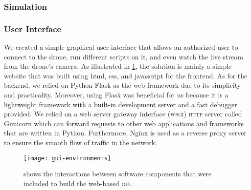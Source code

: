 \documentclass[../main.tex]{subfiles}
\begin{document}
\subsubsection{Simulation}

\lipsum[5]

\subsubsection{User Interface}

We created a simple graphical user interface that allows an authorized user 
to connect to the drone, run different scripts on it, and even watch the live 
stream from the drone's camera. 
As illustrated in \cref{fig:gui-environments}, the solution is mainly a simple 
website that was built using html, css, and javascript for the frontend. As 
for the backend, we relied on Python Flask as the web framework due to 
its simplicity and practicality. Moreover, using Flask was beneficial for us 
because it is a lightweight framework with a built-in development server and a 
fast debugger provided. 
We relied on a web server gateway interface (\textsc{wsgi}) \textsc{http} 
server called Gunicorn which can forward requests to other web applications 
and frameworks that are written in Python.
Furthermore, Nginx is used as a reverse proxy server to ensure the smooth flow 
of traffic in the network. 
\begin{figure}[tbp] 
	\centering
	\texttt{[image: gui-environments]} 
	\caption{shows the interactions between software components that were included to 
		build the web-based \textsc{gui}.}
	\label{fig:gui-environments}  
\end{figure}
\end{document}
